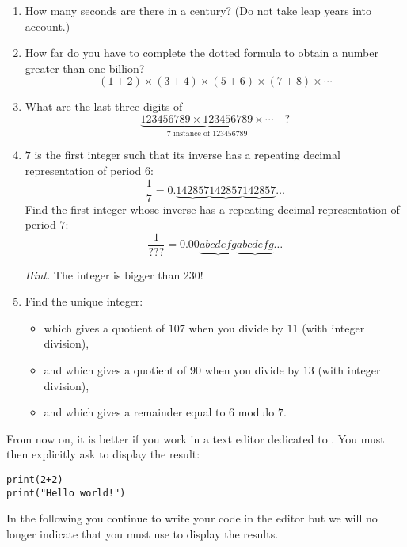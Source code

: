 \documentclass[11pt,class=report,crop=false]{standalone}
\begin{document}
\begin{activite}


\begin{enumerate}
  \item How many seconds are there in a century? (Do not take leap years into account.)
  
  \item How far do you have to complete the dotted formula to obtain a number greater than one billion?
  $$(1+2)\times(3+4)\times(5+6)\times(7+8)\times\cdots$$
  
  \item What are the last three digits of 
  $$\underbrace{123456789 \times 123456789 \times \cdots}_{7 \text{ instance of } 123456789} \quad ?$$
  
  \item $7$ is the first integer such that its inverse has a repeating decimal representation of period $6$:
  $$\frac{1}{7} = 0.\underbrace{142857}\underbrace{142857}\underbrace{142857}\ldots$$ 
  Find the first integer whose inverse has a repeating decimal representation of period $7$:
  $$\frac{1}{???} = 0.00\underbrace{abcdefg}\underbrace{abcdefg}\ldots$$
  
  \emph{Hint.} The integer is bigger than $230$!
  
  \item Find the unique integer:
  \begin{itemize}
    \item which gives a quotient of $107$ when you divide by $11$ (with integer division),
    \item and which gives a quotient of $90$ when you divide by $13$ (with integer division),
    \item and which gives a remainder equal to $6$ modulo $7$.
  \end{itemize}
    
\end{enumerate}

\end{activite}


\begin{cours}
From now on, it is better if you work in a text editor dedicated to \Python. You must then explicitly ask to display the result:
\begin{lstlisting}
print(2+2)
print("Hello world!")
\end{lstlisting}

In the following you continue to write your code in the editor but we will no longer indicate that you must use  to display the results.
\end{cours}
\end{document}
